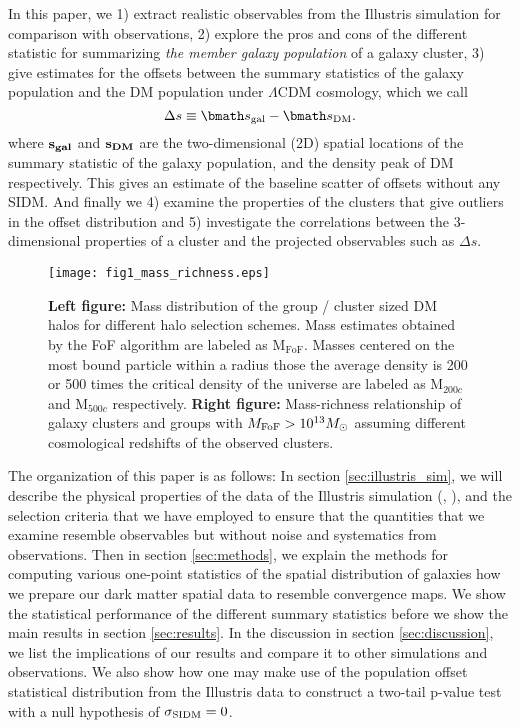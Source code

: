 In this paper, we 
1) extract realistic observables from the Illustris simulation for
comparison with observations, 2) explore the pros and cons of the different statistic for 
summarizing {\it the member galaxy population} of a galaxy cluster, 3)	
give estimates for the offsets between the summary statistics of the galaxy  
population and the DM population under $\Lambda$CDM cosmology, which we call 
\begin{equation}
	\Delta s \equiv \vec{s}_{\rm gal} - \vec{s}_{\rm DM}.
\end{equation}
where $\bf{s}_{gal}$ and $\bf{s}_{DM}$ are the two-dimensional (2D) spatial
locations of the summary statistic of the galaxy population, and the density
peak of DM respectively. This gives
an estimate of the baseline scatter of offsets without any SIDM. And finally we 
4) examine the properties of the clusters that give outliers in 
the offset distribution and 5) investigate the  
correlations between the 3-dimensional properties of a cluster and the projected 
observables such as $\Delta s$. 
\begin{figure*}
	\texttt{[image: fig1\_mass\_richness.eps]}
	\caption{ {\bf Left figure:} Mass distribution of the group / cluster sized 
		DM halos for different halo selection schemes. Mass estimates obtained by the
		FoF algorithm are labeled as  M$_{\text{FoF}}$.
		Masses centered on the most bound particle within a radius those the 
		average density is 200 or 500 times the critical density of the universe are 
		labeled as M$_{200c}$ and M$_{500c}$ respectively. 
		{\bf Right figure:} 
		Mass-richness relationship of galaxy clusters and groups with 
		$M_{\rm FoF} > 10^{13} M_{\odot}$ assuming different cosmological redshifts
		of the observed clusters. 
\label{fig:mass_richness}}
\end{figure*}

The organization of this paper is as follows:
In section \ref{sec:illustris_sim}, we will describe the physical properties of 
the data of the Illustris
simulation (\citealt{Vogelsberger2014}, \citealt{Genel2014a}), 
and the selection criteria that we have employed to ensure that the
quantities that we examine resemble observables but without noise and
systematics from observations. 
Then in section \ref{sec:methods}, 
we explain the methods for computing various 
one-point statistics of the spatial distribution of galaxies how we prepare our dark
matter spatial data to resemble convergence maps. We show the statistical performance
of the different summary statistics before we show the main results
in section \ref{sec:results}. In the discussion in section \ref{sec:discussion}, 
we list the implications of our
results and compare it to other simulations and observations. We also 
show how one may make use of the population offset statistical distribution
from the Illustris data to construct a two-tail p-value test with 
a null hypothesis of $\sigma_{\rm SIDM} = 0$. 


